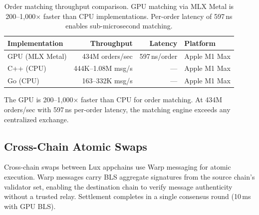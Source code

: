 \begin{table}[h]
\centering
\begin{tabular}{lrrl}
\toprule
\textbf{Implementation} & \textbf{Throughput} & \textbf{Latency} & \textbf{Platform} \\
\midrule
GPU (MLX Metal)   & 434M orders/sec   & 597\,ns/order  & Apple M1 Max \\
C++ (CPU)         & 444K--1.08M msg/s & ---            & Apple M1 Max \\
Go (CPU)          & 163--332K msg/s   & ---            & Apple M1 Max \\
\bottomrule
\end{tabular}
\caption{Order matching throughput comparison. GPU matching via MLX Metal is
200--1{,}000$\times$ faster than CPU implementations. Per-order latency of 597\,ns
enables sub-microsecond matching.}
\end{table}

The GPU is 200--1{,}000$\times$ faster than CPU for order matching. At 434M orders/sec
with 597\,ns per-order latency, the matching engine exceeds any centralized exchange.

\subsection{Cross-Chain Atomic Swaps}

Cross-chain swaps between Lux appchains use Warp messaging for atomic execution.
Warp messages carry BLS aggregate signatures from the source chain's validator set,
enabling the destination chain to verify message authenticity without a trusted relay.
Settlement completes in a single consensus round (10\,ms with GPU BLS).

